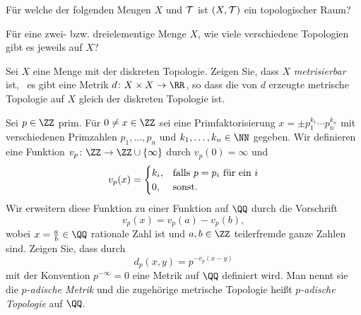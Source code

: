 

\setcounter{Sheet}{1}



\maketitle
\begin{exercise}
Für welche der folgenden Mengen \(X\) und \(\cal T\) ist \((X,\cal T)\)
ein topologischer Raum?
\end{exercise}

\begin{exercise}
Für eine zwei- bzw. dreielementige Menge \(X\), wie viele verschiedene
Topologien gibt es jeweils auf \(X\)?
\end{exercise}

\begin{exercise}
Sei \(X\) eine Menge mit der diskreten Topologie. Zeigen Sie, dass \(X\)
\emph{metrisierbar} ist, \ddh~es gibt eine Metrik \(d\colon X\times
X\to\RR\), so dass die von \(d\) erzeugte metrische Topologie auf \(X\)
gleich der diskreten Topologie ist.
\end{exercise}

\begin{exercise}
Sei \(p\in \ZZ\) prim. Für \(0\neq x\in\ZZ\) sei eine Primfaktorisierung
\(x = \pm p_1^{k_1}\cdots p_n^{k_n}\) mit verschiedenen Primzahlen
\(p_1,\dots,p_n\) und \(k_1,\dots,k_n\in\NN\) gegeben. Wir definieren
eine Funktion \(v_p\colon\ZZ\to\ZZ\cup\{\infty\}\) durch \(v_p(0) =
\infty\) und
\[
v_p(x) = \begin{cases}
k_i,& \textnormal{falls \(p = p_i\) für ein \(i\)} \\
0, &\textnormal{sonst.}
\end{cases}
\]
Wir erweitern diese Funktion zu einer Funktion auf \(\QQ\) durch die
Vorschrift
\[
v_p(x) = v_p(a) - v_p(b),
\]
wobei \(x = \tfrac{a}{b}\in\QQ\) rationale Zahl ist und \(a,b\in\ZZ\)
teilerfremde ganze Zahlen sind. Zeigen Sie, dass durch
\[
d_p(x,y) = p^{-v_p(x-y)}
\]
mit der Konvention \(p^{-\infty} = 0\) eine Metrik auf \(\QQ\) definiert
wird. Man nennt sie die \emph{\(p\)-adische Metrik} und die zugehörige
metrische Topologie heißt \emph{\(p\)-adische Topologie} auf \(\QQ\).
\end{exercise}

